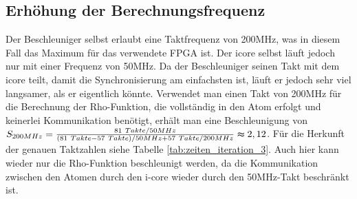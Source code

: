 \subsection{Erhöhung der Berechnungsfrequenz}
Der Beschleuniger selbst erlaubt eine Taktfrequenz von 200MHz, was in diesem Fall das Maximum für das verwendete FPGA ist. Der icore selbst
läuft jedoch nur mit einer Frequenz von 50MHz. Da der Beschleuniger seinen Takt mit dem icore teilt, damit die Synchronisierung am einfachsten ist,
läuft er jedoch sehr viel langsamer, als er eigentlich könnte. Verwendet man einen Takt von 200MHz
für die Berechnung der Rho-Funktion, die vollständig in den Atom erfolgt und keinerlei Kommunikation benötigt, erhält man eine Beschleunigung von
$S_{200MHz} = \frac{81\ Takte / 50MHz}{(81\ Takte - 57\ Takte) / 50MHz + 57\ Takte / 200MHz} \thickapprox 2,12$.
Für die Herkunft der genauen Taktzahlen siehe Tabelle \ref{tab:zeiten_iteration_3}. Auch hier kann wieder nur die Rho-Funktion beschleunigt werden,
da die Kommunikation zwischen den Atomen durch den i-core wieder durch den 50MHz-Takt beschränkt ist.

